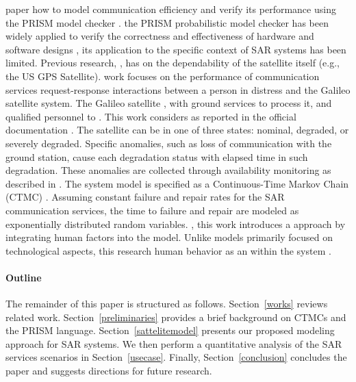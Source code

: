  paper  how to  model communication efficiency and verify its performance using the PRISM model checker  \cite{Kwiatkowskaprism2011}.  the PRISM probabilistic model checker has been widely applied to verify the correctness and effectiveness of hardware and software designs \cite{prismmodelchecker}, its application to the specific context of SAR systems has been limited. Previous research,  \cite{Hoque2015,Yu2015,Zhaoguang2013,Baouyaseaa2024}, has  on  the dependability of the satellite itself (e.g., the US GPS Satellite).  work focuses on the performance of communication services  request-response interactions between a person in distress and the Galileo satellite system. The Galileo satellite ,  with ground services to process it, and  qualified personnel to . This work considers  as reported in the official documentation \cite{galileoperformances,galileoossdd,galileoosperformancereport}. The satellite can be in one of three states: nominal, degraded, or severely degraded. Specific anomalies, such as loss of communication with the ground station, cause each degradation status with elapsed time in such degradation. These anomalies are collected through availability monitoring as described in \cite{galileoperformances,galileoossdd,galileoosperformancereport}. The system model is specified as a Continuous-Time Markov Chain (CTMC) \cite{Kwiatkowska2007}. Assuming constant failure and repair rates for the SAR communication services, the time to failure and repair are modeled as exponentially distributed random variables. , this work introduces a  approach by integrating human factors into the model. Unlike  models primarily focused on technological aspects, this research  human behavior as an  within the system \cite{nunes2018practical}. 

\paragraph*{Outline}The remainder of this paper is structured as follows. Section~\ref{works} reviews related work. Section~\ref{preliminaries} provides a brief background on CTMCs and the PRISM language. Section~\ref{sattelitemodel} presents our proposed modeling approach for SAR systems. We then perform a quantitative analysis of the SAR services scenarios in Section~\ref{usecase}. Finally, Section~\ref{conclusion} concludes the paper and suggests directions for future research.